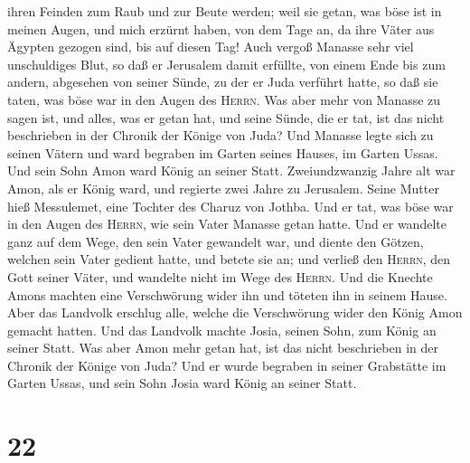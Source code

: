 ihren Feinden zum Raub und zur Beute werden;  weil sie
getan, was böse ist in meinen Augen, und mich erzürnt haben, von dem
Tage an, da ihre Väter aus Ägypten gezogen sind, bis auf diesen Tag!
 Auch vergoß Manasse sehr viel unschuldiges Blut, so daß
er Jerusalem damit erfüllte, von einem Ende bis zum andern, abgesehen
von seiner Sünde, zu der er Juda verführt hatte, so daß sie taten, was
böse war in den Augen des \textsc{Herrn}.  Was aber mehr
von Manasse zu sagen ist, und alles, was er getan hat, und seine Sünde,
die er tat, ist das nicht beschrieben in der Chronik der Könige von
Juda?  Und Manasse legte sich zu seinen Vätern und ward
begraben im Garten seines Hauses, im Garten Ussas. Und sein Sohn Amon
ward König an seiner Statt.  Zweiundzwanzig Jahre alt war
Amon, als er König ward, und regierte zwei Jahre zu Jerusalem. Seine
Mutter hieß Messulemet, eine Tochter des Charuz von Jothba.
 Und er tat, was böse war in den Augen des
\textsc{Herrn}, wie sein Vater Manasse getan hatte.  Und
er wandelte ganz auf dem Wege, den sein Vater gewandelt war, und diente
den Götzen, welchen sein Vater gedient hatte, und betete sie an;
 und verließ den \textsc{Herrn}, den Gott seiner Väter,
und wandelte nicht im Wege des \textsc{Herrn}.  Und die
Knechte Amons machten eine Verschwörung wider ihn und töteten ihn in
seinem Hause.  Aber das Landvolk erschlug alle, welche
die Verschwörung wider den König Amon gemacht hatten. Und das Landvolk
machte Josia, seinen Sohn, zum König an seiner Statt. 
Was aber Amon mehr getan hat, ist das nicht beschrieben in der Chronik
der Könige von Juda?  Und er wurde begraben in seiner
Grabstätte im Garten Ussas, und sein Sohn Josia ward König an seiner
Statt.

\hypertarget{section-21}{%
\section{22}\label{section-21}}

